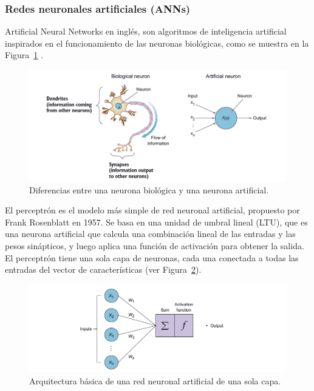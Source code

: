 \subsubsection{Redes neuronales artificiales (ANNs)}

Artificial Neural Networks en inglés, son algoritmos de inteligencia artificial inspirados en el funcionamiento de las neuronas biológicas, como se muestra en la Figura~\ref{fig:ComparacionNeurona} \cite{elgendy2020deep}.

\begin{figure}[H]
    \begin{center}
        \includegraphics[width=1\textwidth]{Images/neuron.png}
    \end{center}
    \caption{Diferencias entre una neurona biológica y una neurona artificial.}
    \label{fig:ComparacionNeurona}
\end{figure}

El perceptrón es el modelo más simple de red neuronal artificial, propuesto por Frank Rosenblatt en 1957. Se basa en una unidad de umbral lineal (LTU), que es una neurona artificial que calcula una combinación lineal de las entradas y las pesos sinápticos, y luego aplica una función de activación para obtener la salida. El perceptrón tiene una sola capa de neuronas, cada una conectada a todas las entradas del vector de características (ver Figura~\ref{fig:ann}).

\begin{figure}[H]
    \begin{center}
        \includegraphics[width=1\textwidth]{Images/ann.png}
    \end{center}
    \caption{Arquitectura básica de una red neuronal artificial de una sola capa.}
    \label{fig:ann}
\end{figure}

